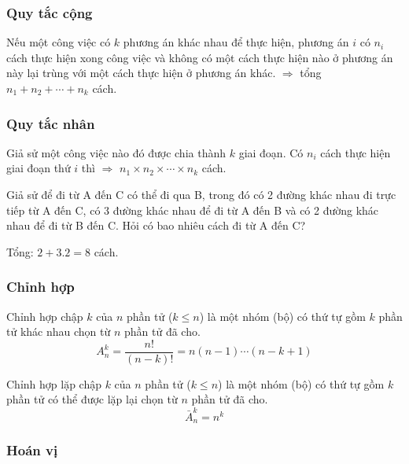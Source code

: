 \documentclass[12pt,a4paper]{article}
\begin{document}
\subsubsection{Quy tắc cộng}

\begin{dinhnghia}
Nếu một công việc có $k$ phương án khác nhau để thực hiện, phương án $i$ có $n_i$ cách thực hiện xong công việc và không có một cách thực hiện nào ở phương án này lại trùng với một cách thực hiện ở phương án khác. $\Rightarrow$ tổng $n_1 + n_2 + \cdots + n_k$ cách.
\end{dinhnghia}

\subsubsection{Quy tắc nhân}

\begin{dinhnghia}
Giả sử một công việc nào đó được chia thành $k$ giai đoạn. Có $n_i$ cách thực hiện giai đoạn thứ $i$ thì $\Rightarrow$ $n_1 \times n_2 \times \cdots \times n_k$ cách.
\end{dinhnghia}

\begin{vidu}[title={Đi từ A đến C}]
Giả sử để đi từ A đến C có thể đi qua B, trong đó có 2 đường khác nhau đi trực tiếp từ A đến C, có 3 đường khác nhau để đi từ A đến B và có 2 đường khác nhau để đi từ B đến C. Hỏi có bao nhiêu cách đi từ A đến C?

Tổng: $2 + 3.2 = 8$ cách.
\end{vidu}

\subsubsection{Chỉnh hợp}

\begin{dinhnghia}[title={Chỉnh hợp}]
Chỉnh hợp chập $k$ của $n$ phần tử ($k \le n$) là một nhóm (bộ) có thứ tự gồm $k$ phần tử khác nhau chọn từ $n$ phần tử đã cho.
\[
  A_n^k = \dfrac{n!}{(n-k)!} = n(n-1)\cdots(n-k+1)
\]
\end{dinhnghia}

\begin{dinhnghia}[title={Chỉnh hợp lặp}]
Chỉnh hợp lặp chập $k$ của $n$ phần tử ($k \le n$) là một nhóm (bộ) có thứ tự gồm $k$ phần tử có thể được lặp lại chọn từ $n$ phần tử đã cho.
\[
  \bar{A}_n^k = n^k
\]
\end{dinhnghia}

\subsubsection{Hoán vị}
\end{document}
